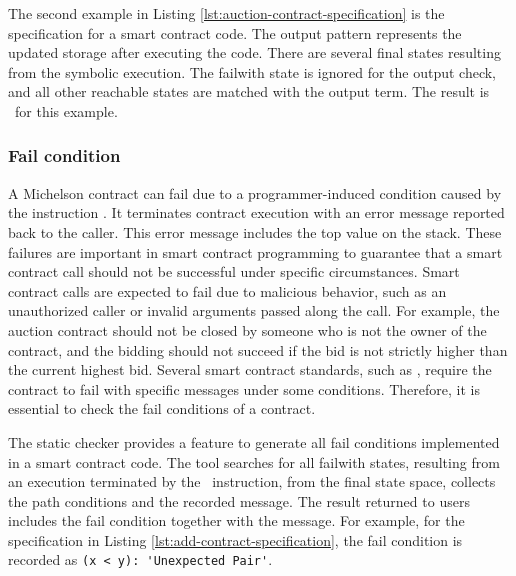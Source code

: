 \documentclass[a4paper,UKenglish,cleveref, autoref, thm-restate]{lipics-v2021}
\begin{document}
The second example in Listing \ref{lst:auction-contract-specification} is the specification for a smart contract code. The output pattern represents the updated storage after executing the code. There are several final states resulting from the symbolic execution. The failwith state is ignored for the output check, and all other reachable states are matched with the output term. The result is \TRUE\ for this example.

\subsubsection{Fail condition}
A Michelson contract can fail due to a programmer-induced condition caused by the instruction \FAILWITH. It terminates contract execution with an error message reported back to the caller. This error message includes the top value on the stack. These failures are important in smart contract programming to guarantee that a smart contract call should not be successful under specific circumstances. Smart contract calls are expected to fail due to malicious behavior, such as an unauthorized caller or invalid arguments passed along the call. For example, the auction contract should not be closed by someone who is not the owner of the contract, and the bidding should not succeed if the bid is not strictly higher than the current highest bid. Several smart contract standards, such as , require the contract to fail with specific messages under some conditions. Therefore, it is essential to check the fail conditions of a contract. 

The static checker provides a feature to generate all fail conditions implemented in a smart contract code. The tool searches for all failwith states, resulting from an execution terminated by the \FAILWITH\ instruction, from the final state space, collects the path conditions and the recorded message. The result returned to users includes the fail condition together with the message. For example, for the specification in Listing \ref{lst:add-contract-specification}, the fail condition is recorded as \lstinline/(x < y): 'Unexpected Pair'/. 
\end{document}

